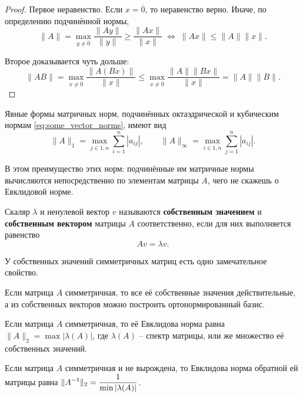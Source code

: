 \documentclass{article}
\begin{document}
\begin{proof}
	Первое неравенство. Если $x=\overline{0}$, то неравенство верно. Иначе,
	по определению подчинённой нормы,
	\[\|A\|=\max_{y\ne\overline{0}}\frac{\|Ay\|}{\|y\|}\ge
	\frac{\|Ax\|}{\|x\|}\;\Leftrightarrow\;
	\|Ax\|\le\|A\|\|x\|.\]

	Второе доказывается чуть дольше:
	\[\|AB\|=\max_{x\ne\overline{0}}\frac{\|A(Bx)\|}{\|x\|}\le
	\max_{x\ne\overline{0}}\frac{\|A\|\|Bx\|}{\|x\|}=\|A\|\|B\|.\]
\end{proof}

\begin{lemma}
	Явные формы матричных норм, подчинённых октаэдрической и кубическим
	нормам \eqref{eq:some_vector_norms}, имеют вид
	\[\|A\|_1=\max_{j\in\overline{1,n}}\sum_{i=1}^{n}|a_{ij}|,\qquad
	\|A\|_\infty=\max_{i\in\overline{1,n}}\sum_{j=1}^{n}|a_{ij}|.\]
\end{lemma}

\proofexercise

В этом преимущество этих норм: подчинённые им матричные нормы вычисляются
непосредственно по элементам матрицы $A$, чего не скажешь о Евклидовой норме.

\begin{define}
	Скаляр $\lambda$ и ненулевой вектор $v$ называются \textbf{собственным
	значением} и \textbf{собственным вектором} матрицы $A$ соответственно,
	если для них выполняется равенство
	\[Av=\lambda v.\]
\end{define}

У собственных значений симметричных матриц есть одно замечательное свойство.
\begin{lemma}\label{eq:symmetric_matrix_props}
	Если матрица $A$ симметричная, то все её собственные значения
	действительные, а из собственных векторов можно построить
	ортонормированный базис.
\end{lemma}

\begin{theorem}
\label{eq:symmetric_matrix_norm}
	Если матрица $A$ симметричная, то её Евклидова норма равна $\|A\|_2=
	\max|\lambda(A)|$, где $\lambda(A)$ -- спектр матрицы, или же множество
	её собственных значений.
\end{theorem}

\begin{corollary}
	Если матрица $A$ симметричная и не вырождена, то Евклидова норма
	обратной ей матрицы равна
	$\mathlarger{\|A^{-1}\|_2=\frac{1}{\min|\lambda(A)|}}$.
\end{corollary}
\end{document}
